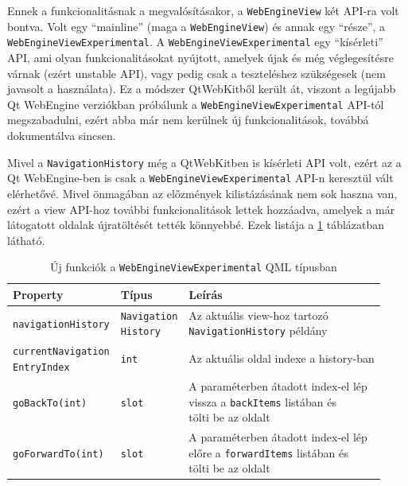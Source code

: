 \documentclass[12pt]{report}
\begin{document}
Ennek a funkcionalitásnak a megvalósításakor, a \texttt{WebEngineView} két API-ra volt
bontva. Volt egy ``mainline'' (maga a \texttt{WebEngineView}) és annak egy ``része'', a
\texttt{WebEngineViewExperimental}. A \texttt{WebEngineViewExperimental} egy ``kísérleti''
API, ami olyan funkcionalitásokat nyújtott, amelyek újak és még véglegesítésre várnak
(ezért unstable API), vagy pedig csak a teszteléshez szükségesek (nem javasolt a használata).
Ez a módszer QtWebKitből került át, viszont a legújabb Qt WebEngine verziókban
próbálunk a \texttt{WebEngineViewExperimental} API-tól megszabadulni, ezért abba már nem
kerülnek új funkcionalitások, továbbá dokumentálva sincsen.

Mivel a \texttt{NavigationHistory} még a QtWebKitben is kísérleti API volt, ezért az a
Qt WebEngine-ben is csak a \texttt{WebEngineViewExperimental} API-n keresztül vált
elérhetővé. Mivel önmagában az előzmények kilistázásának nem sok haszna van, ezért a view
API-hoz további funkcionalitások lettek hozzáadva, amelyek a már látogatott oldalak
újratöltését tették könnyebbé. Ezek listája a \ref{tab:navigation-history-experimental-api}
táblázatban látható.

\begin{table}[ht]
    \centering
    \begin{tabular}{ | l | l | p{194pt} | }
        \hline
        \textbf{Property} & \textbf{Típus} & \textbf{Leírás} \\ \hline

        \texttt{navigationHistory} & \makecell[l]{\texttt{Navigation} \\ \texttt{History}} &
        \makecell[l]{Az aktuális view-hoz tartozó \\ \texttt{NavigationHistory} példány}
        \\ \hline

        \makecell[l]{\texttt{currentNavigation} \\ \texttt{EntryIndex}} & \texttt{int} &
        Az aktuális oldal indexe a history-ban
        \\ \hline

        \texttt{goBackTo(int)} & \texttt{slot} &
        \makecell[l]{A paraméterben átadott index-el lép \\
                     vissza a \texttt{backItems} listában és \\
                     tölti be az oldalt}
        \\ \hline

        \texttt{goForwardTo(int)} & \texttt{slot} &
        \makecell[l]{A paraméterben átadott index-el lép \\
                     előre a \texttt{forwardItems} listában és \\
                     tölti be az oldalt}
        \\ \hline
    \end{tabular}
    \caption{
        \label{tab:navigation-history-experimental-api}
        Új funkciók a \texttt{WebEngineViewExperimental} QML típusban
    }
\end{table}
\end{document}

